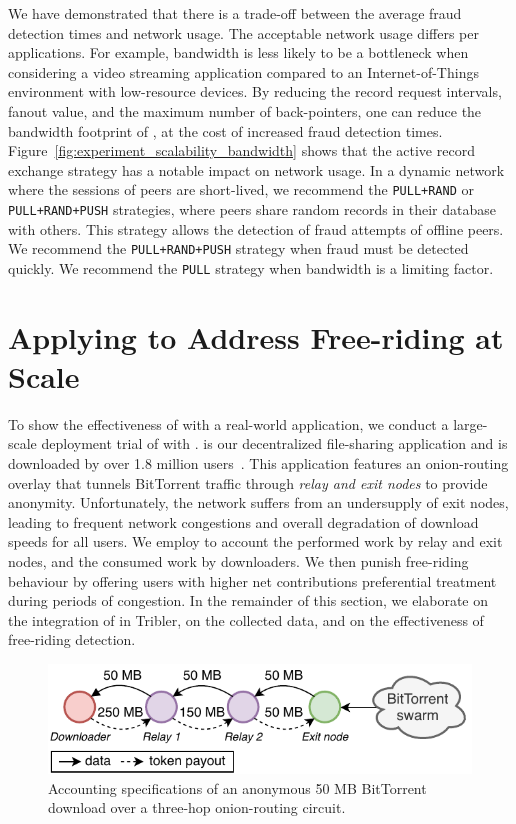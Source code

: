 We have demonstrated that there is a trade-off between the average fraud detection times and network usage.
The acceptable network usage differs per applications.
For example, bandwidth is less likely to be a bottleneck when considering a video streaming application compared to an Internet-of-Things environment with low-resource devices.
By reducing the record request intervals, fanout value, and the maximum number of back-pointers, one can reduce the bandwidth footprint of \TrustChain{}, at the cost of increased fraud detection times.
Figure~\ref{fig:experiment_scalability_bandwidth} shows that the active record exchange strategy has a notable impact on network usage.
In a dynamic network where the sessions of peers are short-lived, we recommend the \texttt{PULL+RAND} or \texttt{PULL+RAND+PUSH} strategies, where peers share random records in their database with others.
This strategy allows the detection of fraud attempts of offline peers.
We recommend the \texttt{PULL+RAND+PUSH} strategy when fraud must  be detected quickly.
We recommend the \texttt{PULL} strategy when bandwidth is a limiting factor.

\section{Applying \TrustChain{} to Address Free-riding at Scale}
\label{sec:deployment}
To show the effectiveness of \TrustChain{} with a real-world application, we conduct a large-scale deployment trial of \TrustChain{} with \Tribler{}.
\Tribler{} is our decentralized file-sharing application and is downloaded by over 1.8 million users~\cite{pouwelse2008tribler}.
This application features an onion-routing overlay that tunnels BitTorrent traffic through \emph{relay and exit nodes} to provide anonymity.
Unfortunately, the \Tribler{} network suffers from an undersupply of exit nodes, leading to frequent network congestions and overall degradation of download speeds for all users.
We employ \TrustChain{} to account the performed work by relay and exit nodes, and the consumed work by downloaders.
We then punish free-riding behaviour by offering users with higher net contributions preferential treatment during periods of congestion.
In the remainder of this section, we elaborate on the integration of \TrustChain{} in Tribler, on the collected data, and on the effectiveness of free-riding detection.

\begin{figure}[t]
	\centering
	\includegraphics[width=.8\linewidth]{trustchain/assets/payouts}
	\caption{Accounting specifications of an anonymous 50 MB BitTorrent download over a three-hop onion-routing circuit.}
	\label{fig:payouts}
\end{figure}

